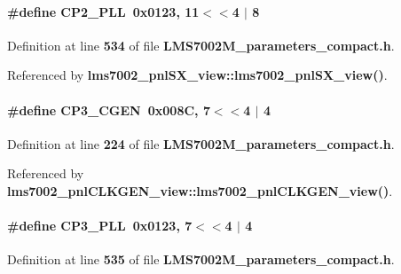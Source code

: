 \paragraph[{C\+P2\+\_\+\+P\+LL}]{\setlength{\rightskip}{0pt plus 5cm}\#define C\+P2\+\_\+\+P\+LL~0x0123, 11$<$$<$4 $\vert$  8}\label{LMS7002M__parameters__compact_8h_ad0ee68f414041b184ade01ec14cf9a76}


Definition at line {\bf 534} of file {\bf L\+M\+S7002\+M\+\_\+parameters\+\_\+compact.\+h}.



Referenced by {\bf lms7002\+\_\+pnl\+S\+X\+\_\+view\+::lms7002\+\_\+pnl\+S\+X\+\_\+view()}.

\paragraph[{C\+P3\+\_\+\+C\+G\+EN}]{\setlength{\rightskip}{0pt plus 5cm}\#define C\+P3\+\_\+\+C\+G\+EN~0x008\+C, 7$<$$<$4 $\vert$  4}\label{LMS7002M__parameters__compact_8h_ac50c062657998b4ca740116fb010bdba}


Definition at line {\bf 224} of file {\bf L\+M\+S7002\+M\+\_\+parameters\+\_\+compact.\+h}.



Referenced by {\bf lms7002\+\_\+pnl\+C\+L\+K\+G\+E\+N\+\_\+view\+::lms7002\+\_\+pnl\+C\+L\+K\+G\+E\+N\+\_\+view()}.

\paragraph[{C\+P3\+\_\+\+P\+LL}]{\setlength{\rightskip}{0pt plus 5cm}\#define C\+P3\+\_\+\+P\+LL~0x0123, 7$<$$<$4 $\vert$  4}\label{LMS7002M__parameters__compact_8h_a188a77d81a23a8d8fb1642b2b6f8ef11}


Definition at line {\bf 535} of file {\bf L\+M\+S7002\+M\+\_\+parameters\+\_\+compact.\+h}.



